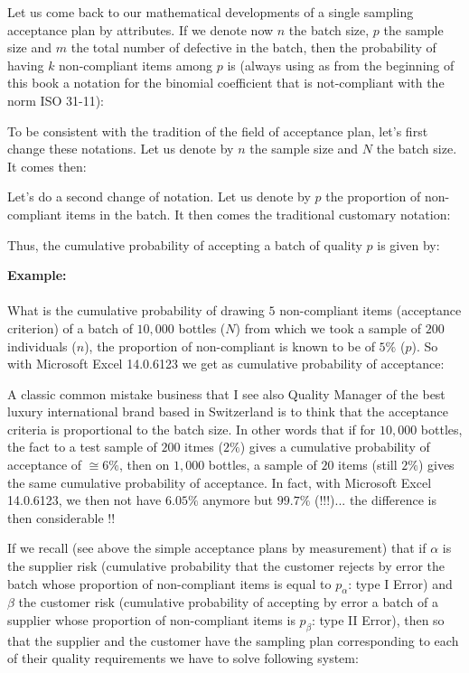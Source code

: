 	Let us come back to our mathematical developments of a single sampling acceptance plan by attributes. If we denote now $n$ the batch size, $p$ the sample size and $m$ the total number of defective in the batch, then the probability of having $k$ non-compliant items among $p$ is (always using as from the beginning of this book a notation for the binomial coefficient that is not-compliant with the norm ISO 31-11):
	
	To be consistent with the tradition of the field of acceptance plan, let's first change these notations. Let us denote by $n$ the sample size and $N$ the batch size. It comes then:
	
	Let's do a second change of notation. Let us denote by $p$ the proportion of non-compliant items in the batch. It then comes the traditional customary notation:
	
	Thus, the cumulative probability of accepting a batch of quality $p$ is given by:
	
	\begin{tcolorbox}[colframe=black,colback=white,sharp corners]
	\textbf{{\Large {}}Example:}\\\\
	What is the cumulative probability of drawing $5$ non-compliant items (acceptance criterion) of a batch of $10,000$ bottles ($N$) from which we took a sample of $200$ individuals ($n$), the proportion of non-compliant is known to be of $5\%$ ($p$). So with Microsoft Excel 14.0.6123 we get as cumulative probability of acceptance:
	
	\end{tcolorbox}
	\begin{tcolorbox}[title=Remark,colframe=black,arc=10pt]
	A classic common mistake business that I see also Quality Manager of the best luxury international brand based in Switzerland is to think that the acceptance criteria is proportional to the batch size. In other words that if for $10,000$ bottles, the fact to a test sample of $200$ itmes ($2\%$) gives a cumulative probability of acceptance of $\cong 6\%$, then on $1,000$ bottles, a sample of $20$ items (still $2\%$) gives the same cumulative probability of acceptance. In fact, with Microsoft Excel 14.0.6123, we then not have $6.05\%$ anymore but $99.7\%$ (!!!)... the difference is then considerable !!
	\end{tcolorbox}	
		If we recall (see above the simple acceptance plans by measurement) that if $\alpha$ is the supplier risk (cumulative probability that the customer rejects by error the batch whose proportion of non-compliant items is equal to $p_\alpha$: type I Error) and $\beta$ the customer risk (cumulative probability of accepting by error a batch of a supplier whose proportion of non-compliant items is $p_\beta$: type II Error), then so that the supplier and the customer have the sampling plan corresponding to each of their quality requirements we have to solve following system:
	
